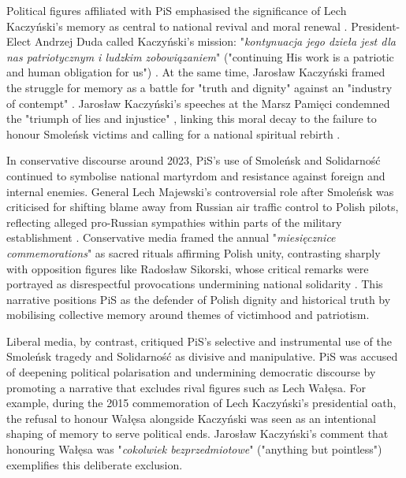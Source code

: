 Political figures affiliated with PiS emphasised the significance of Lech Kaczyński's memory as central to national revival and moral renewal \citep{wpolityce_profesor_2015}. President-Elect Andrzej Duda called Kaczyński’s mission: "\textit{kontynuacja jego dzieła jest dla nas patriotycznym i ludzkim zobowiązaniem}" ("continuing His work is a patriotic and human obligation for us") \citep{wpolityce_lech_2015}. At the same time, Jarosław Kaczyński framed the struggle for memory as a battle for "truth and dignity" against an "industry of contempt" \citep{wpolityce_lech_2015}. Jarosław Kaczyński's speeches at the Marsz Pamięci condemned the "triumph of lies and injustice" \citep{wpolityce_kaczynski_2015}, linking this moral decay to the failure to honour Smoleńsk victims and calling for a national spiritual rebirth \citep{wpolityce_kaczynski_2015-1}.

In conservative discourse around 2023, PiS's use of Smoleńsk and Solidarność continued to symbolise national martyrdom and resistance against foreign and internal enemies. General Lech Majewski's controversial role after Smoleńsk was criticised for shifting blame away from Russian air traffic control to Polish pilots, reflecting alleged pro-Russian sympathies within parts of the military establishment \citep{wpolityce_strzezcie_2023}. Conservative media framed the annual "\textit{miesięcznice commemorations}" as sacred rituals affirming Polish unity, contrasting sharply with opposition figures like Radosław Sikorski, whose critical remarks were portrayed as disrespectful provocations undermining national solidarity \citep{wpolityce_sikorski_2023}. This narrative positions PiS as the defender of Polish dignity and historical truth by mobilising collective memory around themes of victimhood and patriotism.

Liberal media, by contrast, critiqued PiS's selective and instrumental use of the Smoleńsk tragedy and Solidarność as divisive and manipulative. PiS was accused of deepening political polarisation and undermining democratic discourse by promoting a narrative that excludes rival figures such as Lech Wałęsa. For example, during the 2015 commemoration of Lech Kaczyński's presidential oath, the refusal to honour Wałęsa alongside Kaczyński was seen as an intentional shaping of memory to serve political ends. Jarosław Kaczyński's comment that honouring Wałęsa was "\textit{cokolwiek bezprzedmiotowe}" ("anything but pointless") \citep{gazeta_wyborcza_sejm_2015} exemplifies this deliberate exclusion.

